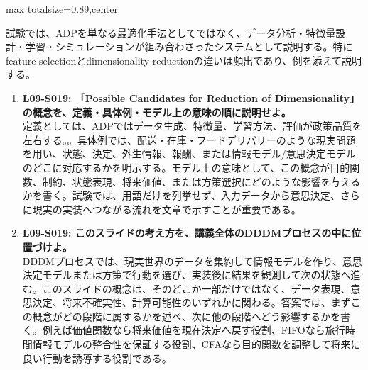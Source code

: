 \begin{minipage}[t]{0.58\textwidth}
\begin{adjustbox}{max totalsize={\textwidth}{0.89\textheight},center}
\begin{minipage}{\textwidth}
試験では、ADPを単なる最適化手法としてではなく、データ分析・特徴量設計・学習・シミュレーションが組み合わさったシステムとして説明する。特にfeature selectionとdimensionality reductionの違いは頻出であり、例を添えて説明する。\par{}\begin{enumerate}\item \textbf{L09-S019: 「Possible Candidates for Reduction of Dimensionality」の概念を、定義・具体例・モデル上の意味の順に説明せよ。}\\定義としては、ADPではデータ生成、特徴量、学習方法、評価が政策品質を左右する。。具体例では、配送・在庫・フードデリバリーのような現実問題を用い、状態、決定、外生情報、報酬、または情報モデル/意思決定モデルのどこに対応するかを明示する。モデル上の意味として、この概念が目的関数、制約、状態表現、将来価値、または方策選択にどのような影響を与えるかを書く。試験では、用語だけを列挙せず、入力データから意思決定、さらに現実の実装へつながる流れを文章で示すことが重要である。\item \textbf{L09-S019: このスライドの考え方を、講義全体のDDDMプロセスの中に位置づけよ。}\\DDDMプロセスでは、現実世界のデータを集約して情報モデルを作り、意思決定モデルまたは方策で行動を選び、実装後に結果を観測して次の状態へ進む。このスライドの概念は、そのどこか一部だけではなく、データ表現、意思決定、将来不確実性、計算可能性のいずれかに関わる。答案では、まずこの概念がどの段階に属するかを述べ、次に他の段階へどう影響するかを書く。例えば価値関数なら将来価値を現在決定へ戻す役割、FIFOなら旅行時間情報モデルの整合性を保証する役割、CFAなら目的関数を調整して将来に良い行動を誘導する役割である。\end{enumerate}
\end{minipage}
\end{adjustbox}
\end{minipage}


